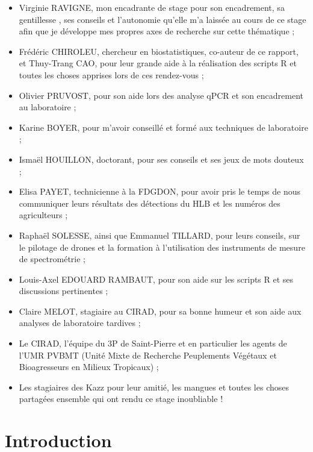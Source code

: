 \documentclass[
  11pt,
  french,
  a4paper,
  extrafontsizes,onecolumn,openright
  ]{memoir}
\begin{document}
\begin{itemize}
\item
  Virginie RAVIGNE, mon encadrante de stage pour son encadrement, sa gentillesse , ses conseils et l'autonomie qu'elle m'a laissée au cours de ce stage afin que je développe mes propres axes de recherche sur cette thématique ;
\item
  Frédéric CHIROLEU, chercheur en biostatistiques, co-auteur de ce rapport, et Thuy-Trang CAO, pour leur grande aide à la réalisation des scripts R et toutes les choses apprises lors de ces rendez-vous ;
\item
  Olivier PRUVOST, pour son aide lors des analyse qPCR et son encadrement au laboratoire ;
\item
  Karine BOYER, pour m'avoir conseillé et formé aux techniques de laboratoire ;
\item
  Ismaël HOUILLON, doctorant, pour ses conseils et ses jeux de mots douteux ;
\item
  Elisa PAYET, technicienne à la FDGDON, pour avoir pris le temps de nous communiquer leurs résultats des détections du HLB et les numéros des agriculteurs ;
\item
  Raphaël SOLESSE, ainsi que Emmanuel TILLARD, pour leurs conseils, sur le pilotage de drones et la formation à l'utilisation des instruments de mesure de spectrométrie ;
\item
  Louis-Axel EDOUARD RAMBAUT, pour son aide sur les scripts R et ses discussions pertinentes ;
\item
  Claire MELOT, stagiaire au CIRAD, pour sa bonne humeur et son aide aux analyses de laboratoire tardives ;
\item
  Le CIRAD, l'équipe du 3P de Saint-Pierre et en particulier les agents de l'UMR PVBMT (Unité Mixte de
  Recherche Peuplements Végétaux et Bioagresseurs en Milieux Tropicaux) ;
\item
  Les stagiaires des Kazz pour leur amitié, les mangues et toutes les choses partagées ensemble qui ont rendu ce stage inoubliable !
\end{itemize}

\scriptsize

\normalsize

\mainmatter

\hypertarget{introduction}{%
\chapter{Introduction}\label{introduction}}
\end{document}
